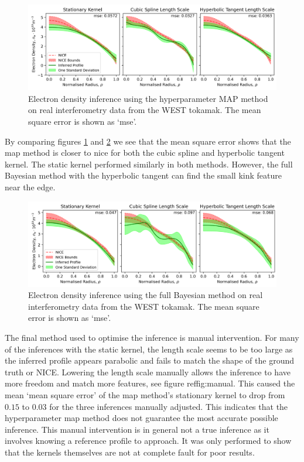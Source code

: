 \begin{figure}[H]
    \centering
    \includegraphics[width=\textwidth]{images/Final/map_real.png}
    \caption{Electron density inference using the hyperparameter MAP method on real interferometry data from the WEST tokamak. The mean square error is shown as `mse'.}
    \label{fig:map_real}
\end{figure}

By comparing figures \ref{fig:map_real} and \ref{fig:fb_real} we see that the mean square error shows that the \gls{map} method is closer to \gls{nice} for both the cubic spline and hyperbolic tangent kernel. The static kernel performed similarly in both methods. However, the full Bayesian method with the hyperbolic tangent can find the small kink feature near the edge.

\begin{figure}[H]
    \centering
    \includegraphics[width=\textwidth]{images/Final/FB_real.png}
    \caption{Electron density inference using the full Bayesian method on real interferometry data from the WEST tokamak. The mean square error is shown as `mse'.}
    \label{fig:fb_real}
\end{figure}

The final method used to optimise the inference is manual intervention. For many of the inferences with the static kernel, the length scale seems to be too large as the inferred profile appears parabolic and fails to match the shape of the ground truth or NICE. Lowering the length scale manually allows the inference to have more freedom and match more features, see figure ref{fig:manual}. This caused the mean `mean square error' of the \gls{map} method's stationary kernel to drop from $0.15$ to $0.03$ for the three inferences manually adjusted. This indicates that the hyperparameter \gls{map} method does not guarantee the most accurate possible inference. This manual intervention is in general not a true inference as it involves knowing a reference profile to approach. It was only performed to show that the kernels themselves are not at complete fault for poor results.


